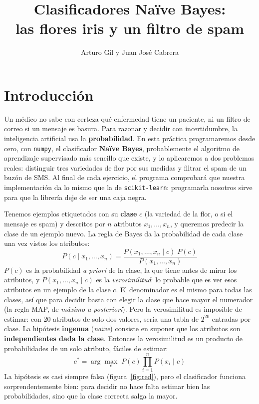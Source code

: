 \documentclass{article}
\title{Clasificadores Naïve Bayes:\\ las flores iris y un filtro de spam}
\author{Arturo Gil y Juan José Cabrera}
\begin{document}
\maketitle

\section*{Introducción}
Un médico no sabe con certeza qué enfermedad tiene un paciente, ni un filtro de correo si un mensaje es basura. Para razonar y decidir con incertidumbre, la inteligencia artificial usa la \textbf{probabilidad}. En esta práctica programaremos desde cero, con \texttt{numpy}, el clasificador \textbf{Naïve Bayes}, probablemente el algoritmo de aprendizaje supervisado más sencillo que existe, y lo aplicaremos a dos problemas reales: distinguir tres variedades de flor por sus medidas y filtrar el spam de un buzón de SMS. Al final de cada ejercicio, el programa comprobará que nuestra implementación da lo mismo que la de \texttt{scikit-learn}: programarla nosotros sirve para que la librería deje de ser una caja negra.

Tenemos ejemplos etiquetados con su \textbf{clase} $c$ (la variedad de la flor, o si el mensaje es spam) y descritos por $n$ atributos $x_1, \ldots, x_n$, y queremos predecir la clase de un ejemplo nuevo. La regla de Bayes da la probabilidad de cada clase una vez vistos los atributos:
\[
P(c \mid x_1, \ldots, x_n) = \frac{P(x_1, \ldots, x_n \mid c)\; P(c)}{P(x_1, \ldots, x_n)}
\]
$P(c)$ es la probabilidad \textit{a priori} de la clase, la que tiene antes de mirar los atributos, y $P(x_1, \ldots, x_n \mid c)$ es la \textit{verosimilitud}: lo probable que es ver esos atributos en un ejemplo de la clase $c$. El denominador es el mismo para todas las clases, así que para decidir basta con elegir la clase que hace mayor el numerador (la regla MAP, de \textit{máximo a posteriori}). Pero la verosimilitud es imposible de estimar: con 20 atributos de solo dos valores, sería una tabla de $2^{20}$ entradas por clase. La hipótesis \textbf{ingenua} (\textit{naïve}) consiste en suponer que los atributos son \textbf{independientes dada la clase}. Entonces la verosimilitud es un producto de probabilidades de un solo atributo, fáciles de estimar:
\[
c^* = \arg\max_c \; P(c) \prod_{i=1}^{n} P(x_i \mid c)
\]
La hipótesis es casi siempre falsa (figura~\ref{fig:red}), pero el clasificador funciona sorprendentemente bien: para decidir no hace falta estimar bien las probabilidades, sino que la clase correcta salga la mayor.
\end{document}
